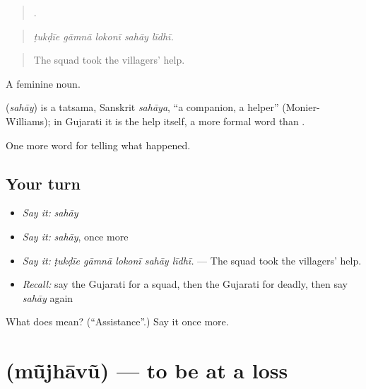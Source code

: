 \begin{quote}
    .
\end{quote}

\begin{quote}
\emph{ṭukḍīe gāmnā lokonī sahāy līdhī.}
\end{quote}

\begin{quote}
The squad took the villagers' help.
\end{quote}

A feminine noun.

\begin{cousinweb}
\textbf{} (\emph{sahāy}) is a tatsama, Sanskrit \emph{sahāya}, \textquotedblleft{}a companion, a helper\textquotedblright{} (Monier-Williams); in Gujarati it is the help itself, a more formal word than \textbf{}.
\end{cousinweb}

\begin{grammarlens}[title={What you've built}]
One more word for telling what happened.
\end{grammarlens}

\subsection*{Your turn}
\begin{itemize}
\raggedright
  \item \emph{Say it:} \emph{sahāy}
  \item \emph{Say it:} \emph{sahāy}, once more
  \item \emph{Say it:} \emph{ṭukḍīe gāmnā lokonī sahāy līdhī.} — The squad took the villagers' help.
  \item \emph{Recall:} say the Gujarati for a squad, then the Gujarati for deadly, then say \emph{sahāy} again
\end{itemize}

\begin{tcolorbox}[breakable,colback=teal!4,colframe=teal!35!black,title={Before you move on}]
What does  mean? (\textquotedblleft{}Assistance\textquotedblright{}.) Say it once more.
\end{tcolorbox}
\section[\texorpdfstring{\gu{મૂંઝાવું} (mū̃jhāvũ)}{મૂંઝાવું (mū̃jhāvũ)}]{ (mū̃jhāvũ) — to be at a loss}

